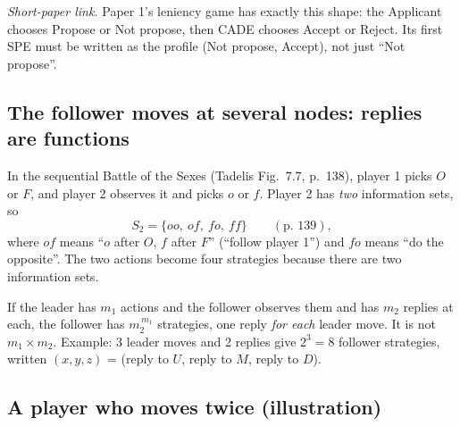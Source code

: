 \documentclass[11pt,a4paper]{article}
\begin{document}
\noindent\emph{Short-paper link.} Paper 1's leniency game has exactly this shape: the Applicant
chooses Propose or Not propose, then CADE chooses Accept or Reject. Its first SPE must be
written as the profile (Not propose, Accept), not just ``Not propose''.

\subsection{The follower moves at several nodes: replies are functions}

In the sequential Battle of the Sexes (Tadelis Fig.~7.7, p.~138), player 1 picks $O$ or $F$, and
player 2 observes it and picks $o$ or $f$. Player 2 has \emph{two} information sets, so
\[
S_2=\{oo,\ of,\ fo,\ ff\}\qquad(\text{p.~139}),
\]
where $of$ means ``$o$ after $O$, $f$ after $F$'' (``follow player 1'') and $fo$ means ``do the
opposite''. The two actions become four strategies because there are two information sets.

\begin{rulebox}
If the leader has $m_1$ actions and the follower observes them and has $m_2$ replies at each, the
follower has $m_2^{\,m_1}$ strategies, one reply \emph{for each} leader move. It is not
$m_1\times m_2$. Example: 3 leader moves and 2 replies give $2^3=8$ follower strategies, written
$(x,y,z)$ = (reply to $U$, reply to $M$, reply to $D$).
\end{rulebox}

\subsection{A player who moves twice (illustration)}

\begin{center}
\end{center}
\end{document}
